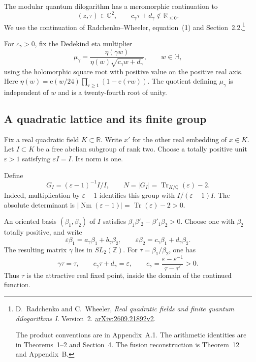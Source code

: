 The modular quantum dilogarithm has a meromorphic continuation to
\[
 (z,\tau)\in\mathbb C^2,\qquad
 c_\gamma\tau+d_\gamma\notin\mathbb R_{\le0}.
\]
We use the continuation of
Radchenko--Wheeler, equation~(1) and Section~2.2.\footnote{
D.~Radchenko and C.~Wheeler,
\emph{Real quadratic fields and finite quantum dilogarithms I}.
Version~2. \href{https://arxiv.org/abs/2609.21892v2}{arXiv:2609.21892v2}.

The product conventions are in Appendix~A.1.
The arithmetic identities are in Theorems~1--2 and Section~4.
The fusion reconstruction is Theorem~12 and Appendix~B.}

For \(c_\gamma>0\), fix the Dedekind eta multiplier
\[
 \mu_\gamma=
 \frac{\eta(\gamma w)}
      {\eta(w)\sqrt{c_\gamma w+d_\gamma}},
 \qquad w\in\mathbb H,
\]
using the holomorphic square root with positive value on the
positive real axis. Here
\(\eta(w)=\mathrm e(w/24)\prod_{r\ge1}(1-\mathrm e(rw))\).
The quotient defining \(\mu_\gamma\) is independent of \(w\)
and is a twenty-fourth root of unity.

\subsection{A quadratic lattice and its finite group}

Fix a real quadratic field \(K\subset\mathbb R\).
Write \(x'\) for the other real embedding of \(x\in K\).
Let \(I\subset K\) be a free abelian subgroup of rank two.
Choose a totally positive unit \(\varepsilon>1\) satisfying
\(\varepsilon I=I\). Its norm is one.

Define
\begin{equation}\label{v4-arith:mf:group}
 G_I=(\varepsilon-1)^{-1}I/I,\qquad
 N=|G_I|=\operatorname{Tr}_{K/\mathbb Q}(\varepsilon)-2.
\end{equation}
Indeed, multiplication by \(\varepsilon-1\) identifies this group
with \(I/(\varepsilon-1)I\).
The absolute determinant is
\(\lvert\operatorname{Nm}(\varepsilon-1)\rvert
=\operatorname{Tr}(\varepsilon)-2>0\).

An oriented basis \((\beta_1,\beta_2)\) of \(I\) satisfies
\(\beta_1\beta'_2-\beta'_1\beta_2>0\).
Choose one with \(\beta_2\) totally positive, and write
\[
 \varepsilon\beta_1=a_\gamma\beta_1+b_\gamma\beta_2,\qquad
 \varepsilon\beta_2=c_\gamma\beta_1+d_\gamma\beta_2.
\]
The resulting matrix \(\gamma\) lies in \(SL_2(\mathbb Z)\).
For \(\tau=\beta_1/\beta_2\), one has
\[
 \gamma\tau=\tau,\qquad c_\gamma\tau+d_\gamma=\varepsilon,
 \qquad
 c_\gamma=\frac{\varepsilon-\varepsilon^{-1}}{\tau-\tau'}>0.
\]
Thus \(\tau\) is the attractive real fixed point, inside the domain
of the continued function.


